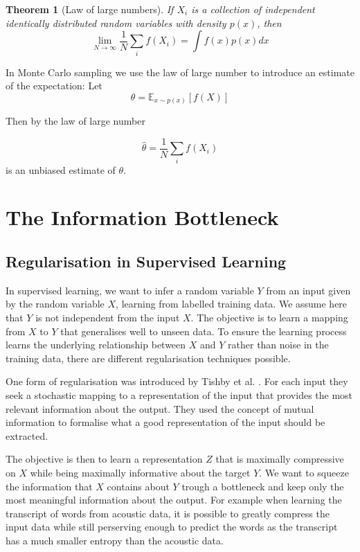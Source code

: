\documentclass[11pt,oneside,openright]{report}
\newtheorem{theorem}{Theorem}
\begin{document}
\begin{theorem}[Law of large numbers]
If $X_i$ is a collection of independent identically distributed random variables with density $p(x)$, then
$$ \lim_{N \to \infty} \frac{1}{N} \sum_i f(X_i) = \int f(x) p(x) dx $$
\end{theorem}

In Monte Carlo sampling we use the law of large number to introduce an estimate  of the expectation:
Let $$\theta = \mathbb{E}_{x \sim p(x)}[f(X)]$$

Then by the law of large number 

$$ \hat{\theta} =  \frac{1}{N} \sum_i f(X_i) $$ is an unbiased estimate of $\theta$.

\section{The Information Bottleneck}
\subsection{Regularisation in Supervised Learning}
In supervised learning, we want to infer a random variable $Y$ from an input given by the random variable $X$, learning from labelled training data. We assume here that $Y$ is not independent from the input $X$. The objective is to learn a mapping from $X$ to $Y$ that generalises well to unseen data. To ensure the learning process learns the underlying relationship between $X$ and $Y$ rather than noise in the training data, there are different regularisation techniques possible.

One form of regularisation was introduced by Tishby et al. \cite{tishby}. For each input they seek a stochastic mapping to a representation of the input that provides the most relevant information about the output. They used the concept of mutual information to formalise what a good representation of the input should be extracted. 

The objective is then to learn a representation $Z$ that is maximally compressive on $X$ while being maximally informative about the target $Y$. We want to squeeze the information that $X$ contains about $Y$ trough a bottleneck and keep only the most meaningful information about the output. For example when learning the transcript of words from acoustic data, it is possible to greatly compress the input data while still perserving enough to predict the words as the transcript has a much smaller entropy than the acoustic data.
\end{document}
